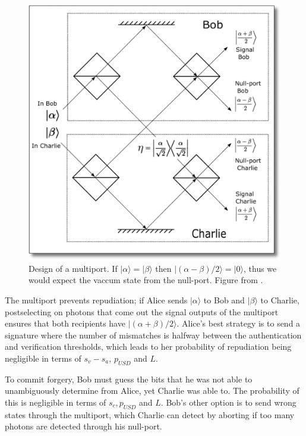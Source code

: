 \documentclass[%
 reprint,
 amsmath,amssymb,
 aps,
 pra,
]{revtex4-1}
\begin{document}
\begin{figure}
\includegraphics[width=\linewidth, natwidth=494, natheight=500]{multiport.png}
\caption{Design of a multiport. If $|\alpha\rangle = |\beta\rangle$ then $|(\alpha - \beta)/2\rangle = |0\rangle$, thus we would expect the vaccum state from the null-port. Figure from \cite{PhysRevLett.112.040502}.}
\label{fig:multiport}
\end{figure}

The multiport prevents repudiation; if Alice sends $|\alpha\rangle$ to Bob and $|\beta\rangle$ to Charlie, postselecting on photons that come out the signal outputs of the multiport ensures that both recipients have $|(\alpha + \beta)/2\rangle$. Alice's best strategy is to send a signature where the number of mismatches is halfway between the authentication and verification thresholds, which leads to her probability of repudiation being negligible in terms of $s_v - s_a$, $p_{USD}$ and $L$.

To commit forgery, Bob must guess the bits that he was not able to unambiguously determine from Alice, yet Charlie was able to. The probability of this is negligible in terms of $s_c, p_{USD}$ and $L$. Bob's other option is to send wrong states through the multiport, which Charlie can detect by aborting if too many photons are detected through his null-port.
\end{document}
